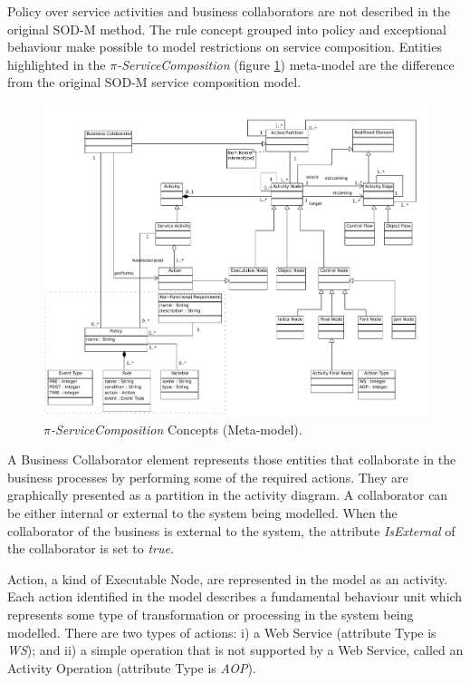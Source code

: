  

Policy over service activities and business collaborators are not described in
the original SOD-M method. The rule concept grouped into policy and
exceptional behaviour make possible to model restrictions on service composition. Entities
highlighted in the \textit{$\pi$-ServiceComposition} (figure
\ref{fig:servicecomposition}) meta-model are the difference from the original
SOD-M service composition model.


\begin{figure}[ht!]
\centering
\includegraphics[width=1.0\textwidth]{chapters/methodology/figs/PiServiceComposition}
\caption{\textit{$\pi$-ServiceComposition} Concepts (Meta-model).}
\label{fig:servicecomposition}
\end{figure}

A {\sc Business Collaborator} element represents those
entities that collaborate in the business processes by
performing some of the required actions. They are graphically
presented as a partition in the activity diagram.
A collaborator can be either internal or external to the
system being modelled. When the collaborator of the
business is external to the system, the attribute \textit{IsExternal} of the
collaborator is set to \textit{true}.

{\sc Action}, a kind of {\sc Executable Node}, are represented
in the model as an activity. Each action identified in
the model describes a fundamental behaviour unit which
represents some type of transformation or processing
in the system being modelled. There are two types of
actions: i) a Web Service (attribute Type is \textit{WS}); and ii) a
simple operation that is not supported by a Web Service,
called an {\sc Activity Operation} (attribute Type is \textit{AOP}).


